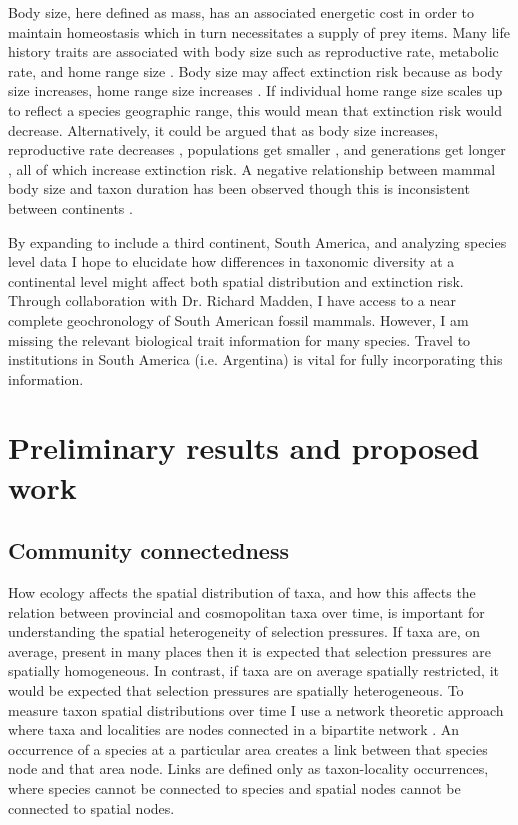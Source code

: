 \documentclass[11pt,letterpaper]{article}
\begin{document}
Body size, here defined as mass, has an associated energetic cost in order to maintain homeostasis which in turn necessitates a supply of prey items. Many life history traits are associated with body size such as reproductive rate, metabolic rate, and home range size \cite{Peters1983a,Damuth1979,Brown1987,Smith2004}. Body size may affect extinction risk because as body size increases, home range size increases \citep{Damuth1979}. If individual home range size scales up to reflect a species geographic range, this would mean that extinction risk would decrease. Alternatively, it could be argued that as body size increases, reproductive rate decreases \citep{Johnson2002b}, populations get smaller \citep{White2007}, and generations get longer \citep{Martin1993a}, all of which increase extinction risk. A negative relationship between mammal body size and taxon duration has been observed \citep{Liow2008,Davidson2012} though this is inconsistent between continents \citep{Tomiya2013,Liow2008}. 

By expanding to include a third continent, South America, and analyzing species level data I hope to elucidate how differences in taxonomic diversity at a continental level might affect both spatial distribution and extinction risk. Through collaboration with Dr. Richard Madden, I have access to a near complete geochronology of South American fossil mammals. However, I am missing the relevant biological trait information for many species. Travel to institutions in South America (i.e. Argentina) is vital for fully incorporating this information.

\section{Preliminary results and proposed work}
\subsection{Community connectedness}
How ecology affects the spatial distribution of taxa, and how this affects the relation between provincial and cosmopolitan taxa over time, is important for understanding the spatial heterogeneity of selection pressures. If taxa are, on average, present in many places then it is expected that selection pressures are spatially homogeneous. In contrast, if taxa are on average spatially restricted, it would be expected that selection pressures are spatially heterogeneous. To measure taxon spatial distributions over time I use a network theoretic approach where taxa and localities are nodes connected in a bipartite network \citep{Sidor2013,Vilhena2013,Vilhena2013b}. An occurrence of a species at a particular area creates a link between that species node and that area node. Links are defined only as taxon-locality occurrences, where species cannot be connected to species and spatial nodes cannot be connected to spatial nodes. %
\end{document}
